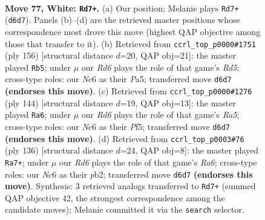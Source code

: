 \documentclass[11pt]{article}
\begin{document}
\clearpage

\begin{figure}[p]\centering
\begin{subfigure}{0.46\textwidth}\centering
\resizebox{\linewidth}{!}{%
\newchessgame
\chessboard[
  setfen={8/5kp1/2NR1p2/7p/3P3P/r5P1/5K2/8 w - - 47 77},
  showmover=false,
  pgfstyle=straightmove, color=movearrow, markmove={d6-d7}
]}
\caption{}
\end{subfigure}\hfill
\begin{subfigure}{0.46\textwidth}\centering
\resizebox{\linewidth}{!}{%
\newchessgame
\chessboard[
  setfen={8/8/5pk1/P2R3p/7P/2r3P1/6K1/8 w - - 5 79},
  showmover=false,
  pgfstyle=straightmove, color=movearrow, markmove={d5-b5}
]}
\caption{}
\end{subfigure}
\\[4pt]
\begin{subfigure}{0.46\textwidth}\centering
\resizebox{\linewidth}{!}{%
\newchessgame
\chessboard[
  setfen={8/6k1/5p2/R4PpP/p2r2P1/7K/8/8 w - - 4 73},
  showmover=false,
  pgfstyle=straightmove, color=movearrow, markmove={a5-a6}
]}
\caption{}
\end{subfigure}\hfill
\begin{subfigure}{0.46\textwidth}\centering
\resizebox{\linewidth}{!}{%
\newchessgame
\chessboard[
  setfen={8/5kp1/R6p/4P2P/P2K2P1/8/1p6/1r6 w - - 4 69},
  showmover=false,
  pgfstyle=straightmove, color=movearrow, markmove={a6-a7}
]}
\caption{}
\end{subfigure}
\caption{\textbf{Move 77, White: \texttt{Rd7+}.} (a) Our position; Melanie plays \texttt{Rd7+} (\texttt{d6d7}). Panels (b)--(d) are the retrieved master positions whose correspondence most drove this move (highest QAP objective among those that transfer to it). (b) Retrieved from \texttt{ccrl\_top\_p0000\#1751} (ply 156) [structural distance $d$=20, QAP obj=21]: the master played \texttt{Rb5}; under $\mu$ our \emph{Rd6} plays the role of that game's \emph{Rd5}; cross-type roles: our \emph{N}c6 as their \emph{P}a5; transferred move \texttt{d6d7} \textbf{(endorses this move)}. (c) Retrieved from \texttt{ccrl\_top\_p0000\#1276} (ply 144) [structural distance $d$=19, QAP obj=13]: the master played \texttt{Ra6}; under $\mu$ our \emph{Rd6} plays the role of that game's \emph{Ra5}; cross-type roles: our \emph{N}c6 as their \emph{P}f5; transferred move \texttt{d6d7} \textbf{(endorses this move)}. (d) Retrieved from \texttt{ccrl\_top\_p0003\#76} (ply 136) [structural distance $d$=24, QAP obj=8]: the master played \texttt{Ra7+}; under $\mu$ our \emph{Rd6} plays the role of that game's \emph{Ra6}; cross-type roles: our \emph{N}c6 as their \emph{p}b2; transferred move \texttt{d6d7} \textbf{(endorses this move)}. Synthesis: 3 retrieved analogs transferred to \texttt{Rd7+} (summed QAP objective 42, the strongest correspondence among the candidate moves); Melanie committed it via the \texttt{search} selector.}
\label{fig:thought-m152}
\end{figure}
\end{document}

